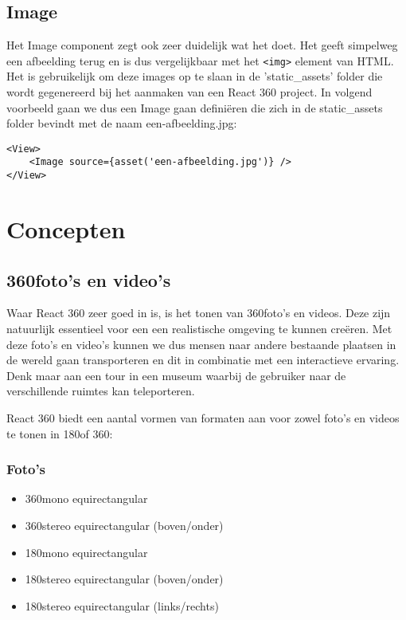 \subsection{Image}
\label{subsec:image}
Het Image component zegt ook zeer duidelijk wat het doet. Het geeft simpelweg een afbeelding terug en is dus vergelijkbaar met het \lstinline[basicstyle=\ttfamily\color{red}]|<img>| element van HTML. Het is gebruikelijk om deze images op te slaan in de 'static_assets' folder die wordt gegenereerd bij het aanmaken van een React 360 project. In volgend voorbeeld gaan we dus een Image gaan definiëren die zich in de static\_assets folder bevindt met de naam een-afbeelding.jpg:

\begin{lstlisting}[frame=single, caption=Het Image component met als bron een-afbeelding.jpg.]
<View>
	<Image source={asset('een-afbeelding.jpg')} />
</View>
\end{lstlisting}

\section{Concepten}

\subsection{360\textdegree foto's en video's}
\label{subsec:360-photo-video}
Waar React 360 zeer goed in is, is het tonen van 360\textdegree foto's en videos. Deze zijn natuurlijk essentieel voor een een realistische omgeving te kunnen creëren. Met deze foto's en video's kunnen we dus mensen naar andere bestaande plaatsen in de wereld gaan transporteren en dit in combinatie met een interactieve ervaring. Denk maar aan een tour in een museum waarbij de gebruiker naar de verschillende ruimtes kan teleporteren.

React 360 biedt een aantal vormen van formaten aan voor zowel foto's en videos te tonen in 180\textdegree of 360\textdegree:

\subsubsection{Foto's}
\begin{itemize}
	\item 360\textdegree mono equirectangular
	\item 360\textdegree stereo equirectangular (boven/onder)
	\item 180\textdegree mono equirectangular
	\item 180\textdegree stereo equirectangular (boven/onder)
	\item 180\textdegree stereo equirectangular (links/rechts)
\end{itemize}

